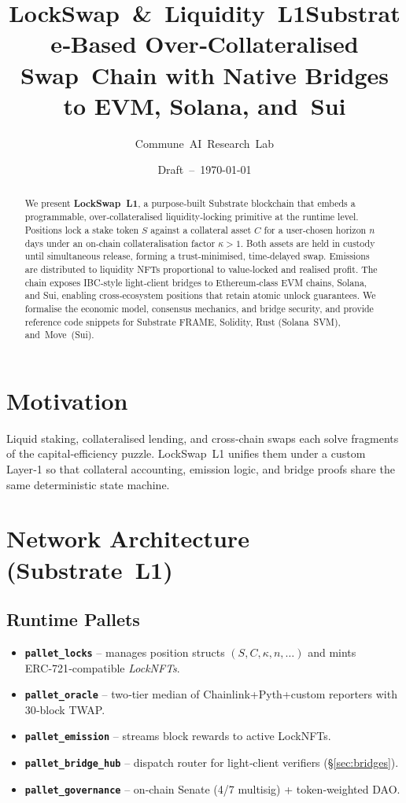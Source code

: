 \documentclass[11pt]{article}
\title{LockSwap & Liquidity L1\A Substrate‑Based Over‑Collateralised Swap Chain with Native Bridges to EVM, Solana, and Sui}
\author{Commune AI Research Lab}
\date{Draft -- \today}
\begin{document}
\maketitle
\begin{abstract}
We present \textbf{LockSwap L1}, a purpose‑built Substrate blockchain that embeds a programmable, over‑collateralised liquidity‑locking primitive at the runtime level. Positions lock a stake token $S$ against a collateral asset $C$ for a user‑chosen horizon $n$ days under an on‑chain collateralisation factor $\kappa>1$. Both assets are held in custody until simultaneous release, forming a trust‑minimised, time‑delayed swap. Emissions are distributed to liquidity NFTs proportional to value‑locked and realised profit.  The chain exposes IBC‑style light‑client bridges to Ethereum‑class EVM chains, Solana, and Sui, enabling cross‑ecosystem positions that retain atomic unlock guarantees. We formalise the economic model, consensus mechanics, and bridge security, and provide reference code snippets for Substrate FRAME, Solidity, Rust (Solana SVM), and Move (Sui).
\end{abstract}
\tableofcontents
\newpage

\section{Motivation}
Liquid staking, collateralised lending, and cross‑chain swaps each solve fragments of the capital‑efficiency puzzle.  LockSwap L1 unifies them under a custom Layer‑1 so that collateral accounting, emission logic, and bridge proofs share the same deterministic state machine.

\section{Network Architecture (Substrate L1)}\label{sec:architecture}
\subsection{Runtime Pallets}
\begin{itemize}
\item \textbf{\texttt{pallet_locks}}  -- manages position structs $(S,C,\kappa,n,\dots)$ and mints ERC‑721‑compatible \emph{LockNFTs}.
\item \textbf{\texttt{pallet_oracle}} -- two‑tier median of Chainlink+Pyth+custom reporters with 30‑block TWAP.
\item \textbf{\texttt{pallet_emission}} -- streams block rewards to active LockNFTs.
\item \textbf{\texttt{pallet_bridge_hub}} -- dispatch router for light‑client verifiers (§\ref{sec:bridges}).
\item \textbf{\texttt{pallet_governance}} -- on‑chain Senate (4/7 multisig) + token‑weighted DAO.
\end{itemize}
\end{document}
